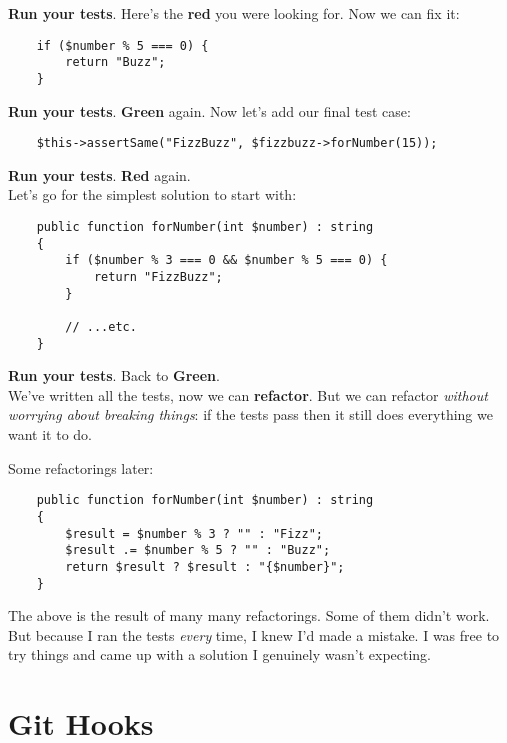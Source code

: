\textbf{Run your tests}. Here's the \textbf{red} you were looking for. Now we can fix it:

\begin{verbatim}
    if ($number % 5 === 0) {
        return "Buzz";
    }
\end{verbatim}

\textbf{Run your tests}. \textbf{Green} again. Now let's add our final test case:

\begin{verbatim}
    $this->assertSame("FizzBuzz", $fizzbuzz->forNumber(15));
\end{verbatim}

\textbf{Run your tests}. \textbf{Red} again.
\\

Let's go for the simplest solution to start with:

\begin{verbatim}
    public function forNumber(int $number) : string
    {
        if ($number % 3 === 0 && $number % 5 === 0) {
            return "FizzBuzz";
        }

        // ...etc.
    }
\end{verbatim}

\textbf{Run your tests}. Back to \textbf{Green}.
\\

We've written all the tests, now we can \textbf{refactor}. But we can refactor \textit{without worrying about breaking things}: if the tests pass then it still does everything we want it to do.
\\

\hr

Some refactorings later:

\begin{verbatim}
    public function forNumber(int $number) : string
    {
        $result = $number % 3 ? "" : "Fizz";
        $result .= $number % 5 ? "" : "Buzz";
        return $result ? $result : "{$number}";
    }
\end{verbatim}

The above is the result of many many refactorings. Some of them didn't work. But because I ran the tests \textit{every} time, I knew I'd made a mistake. I was free to try things and came up with a solution I genuinely wasn't expecting.


\section{Git Hooks}


